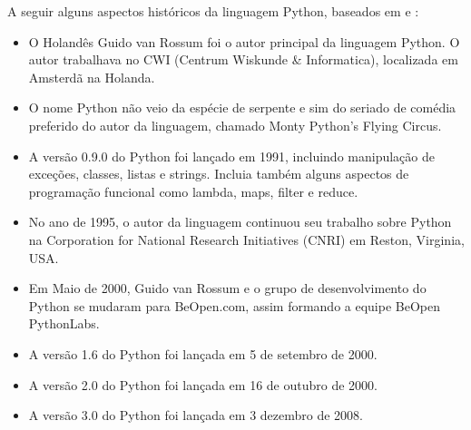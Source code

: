 A seguir alguns aspectos históricos da linguagem Python, baseados em\cite{Perkovic2016} e \cite{Borges2014} :
\begin{itemize}
  \item O Holandês Guido van Rossum foi o autor principal da linguagem Python. O autor trabalhava no CWI (Centrum Wiskunde \& Informatica), localizada em Amsterdã na Holanda.
  \item  O nome Python não veio da espécie de serpente e sim do seriado de comédia preferido do autor da linguagem, chamado Monty Python's Flying Circus.
  \item A versão 0.9.0 do Python foi lançado em 1991, incluindo manipulação de exceções, classes, listas e strings. Incluia também alguns aspectos de programação funcional como lambda, maps, filter e reduce.
  \item  No ano de 1995, o autor da linguagem continuou seu trabalho sobre Python na Corporation for National Research Initiatives (CNRI) em Reston, Virginia, USA.
  \item  Em Maio de 2000, Guido van Rossum e o grupo de desenvolvimento do Python se mudaram para BeOpen.com, assim formando a equipe BeOpen PythonLabs.
  \item A versão 1.6 do Python foi lançada em 5 de setembro de 2000.
  \item A versão 2.0  do Python foi lançada em 16 de outubro de 2000.
  \item A versão 3.0 do Python foi lançada em 3 dezembro de 2008.
\end{itemize}



